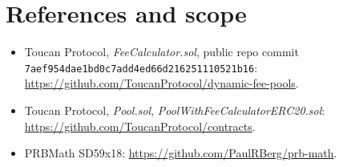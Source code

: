 \documentclass[11pt]{article}
\begin{document}
\section{References and scope}
\begin{itemize}
\item Toucan Protocol, \emph{FeeCalculator.sol}, public repo commit \texttt{7aef954dae1bd0c7add4ed66d216251110521b16}: \url{https://github.com/ToucanProtocol/dynamic-fee-pools}.
\item Toucan Protocol, \emph{Pool.sol}, \emph{PoolWithFeeCalculatorERC20.sol}: \url{https://github.com/ToucanProtocol/contracts}.
\item PRBMath SD59x18: \url{https://github.com/PaulRBerg/prb-math}.
\end{itemize}
\end{document}
